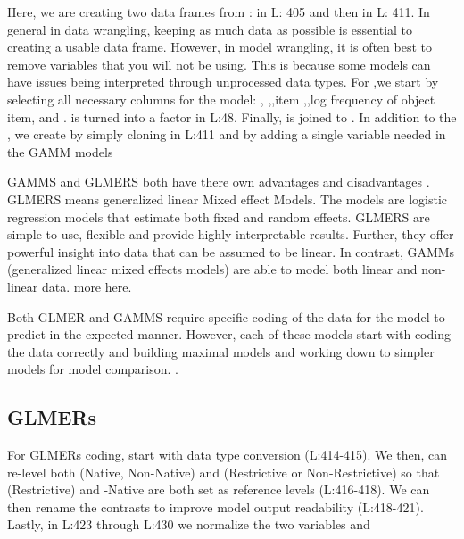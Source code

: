  Here, we are creating two data frames from :  in L: 405 and then  in L: 411. In general in data wrangling, keeping as much data as possible is essential to creating a usable data frame. However, in model wrangling, it is often best to remove variables that you will not be using. This is because some models can have issues being interpreted through unprocessed data types. For ,we start by selecting all necessary columns for the model: , ,,item ,,log frequency of object item, and  .  is turned into a factor in L:48. Finally,  is joined to . In addition to the , we create  by simply cloning  in L:411 and by adding a single variable needed in the GAMM models



GAMMS and GLMERS both have there own advantages and disadvantages \parencite{Ito_Knoeferle_2022}. GLMERS means generalized linear Mixed effect Models. The models are logistic regression models that estimate both fixed and random effects. GLMERS are simple to use, flexible and provide highly interpretable results. Further, they offer powerful insight into data that can be assumed to be linear. In contrast, GAMMs (generalized linear mixed effects models) are able to model both linear and non-linear data. more here.

Both GLMER and GAMMS require specific coding of the data for the model to predict in the expected manner. However, each of these models start with coding the data correctly and building maximal models and working down to simpler models for model comparison. \parencite{max model}.

\subsection{GLMERs}

For GLMERs coding, start with data type conversion (L:414-415). We then, can re-level both (Native, Non-Native) and (Restrictive or Non-Restrictive) so that (Restrictive) and -Native are both set as reference levels (L:416-418).  We can then rename the contrasts to improve model output readability (L:418-421). Lastly, in L:423 through L:430 we normalize the two variables  and 

